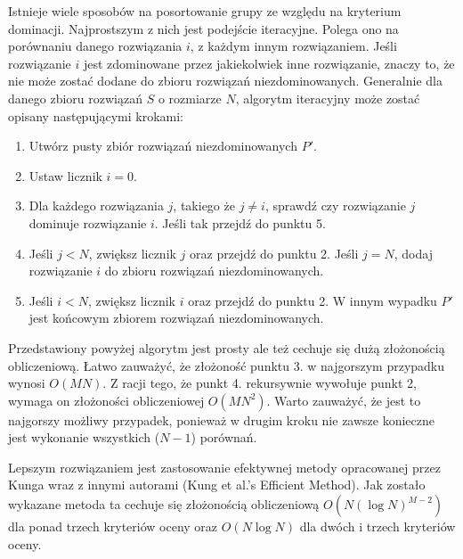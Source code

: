 \documentclass[twoside]{iisthesis}
\begin{document}
Istnieje wiele sposobów na posortowanie grupy ze względu na kryterium dominacji. Najprostszym z nich jest podejście iteracyjne. Polega ono na porównaniu danego rozwiązania $i$, z każdym innym rozwiązaniem. Jeśli rozwiązanie $i$ jest zdominowane przez jakiekolwiek inne rozwiązanie, znaczy to, że nie może zostać dodane do zbioru rozwiązań niezdominowanych. Generalnie dla danego zbioru rozwiązań $S$ o rozmiarze $N$, algorytm iteracyjny może zostać opisany następującymi krokami:\\

\begin{enumerate}
	\item Utwórz pusty zbiór rozwiązań niezdominowanych $P'$.
	\item Ustaw licznik $i = 0$.
	\item Dla każdego rozwiązania $j$, takiego że $j \neq i$, sprawdź czy rozwiązanie $j$ dominuje rozwiązanie $i$. Jeśli tak przejdź do punktu 5.
	\item Jeśli $j < N$, zwiększ licznik $j$ oraz przejdź do punktu 2. Jeśli $j = N$, dodaj rozwiązanie $i$ do zbioru rozwiązań niezdominowanych.
	\item Jeśli $i < N$, zwiększ licznik $i$ oraz przejdź do punktu 2. W innym wypadku $P'$ jest końcowym zbiorem rozwiązań niezdominowanych.\\
\end{enumerate}
Przedstawiony powyżej algorytm jest prosty ale też cechuje się dużą złożonością obliczeniową. Łatwo zauważyć, że złożoność punktu 3. w najgorszym przypadku wynosi $O(MN)$. Z racji tego, że punkt 4. rekursywnie wywołuje punkt 2, wymaga on złożoności obliczeniowej $O(MN^{2})$. Warto zauważyć, że jest to najgorszy możliwy przypadek, ponieważ w drugim kroku nie zawsze konieczne jest wykonanie wszystkich ($N-1$) porównań.

Lepszym rozwiązaniem jest zastosowanie efektywnej metody opracowanej przez Kunga wraz z innymi autorami (Kung et al.'s Efficient Method). Jak zostało wykazane metoda ta cechuje się złożonością obliczeniową $O(N(\log N)^{M-2})$ dla ponad trzech kryteriów oceny oraz $O(N\log N)$ dla dwóch i trzech kryteriów oceny.
\end{document}
